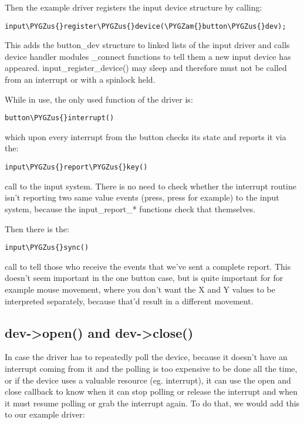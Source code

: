 \documentclass[a4paper,8pt,english]{sphinxmanual}
\def\PYGZus{\char`\_}
\def\PYGZam{\char`\&}
\begin{document}
Then the example driver registers the input device structure by calling:

\begin{Verbatim}[commandchars=\\\{\}]
input\PYGZus{}register\PYGZus{}device(\PYGZam{}button\PYGZus{}dev);
\end{Verbatim}

This adds the button\_dev structure to linked lists of the input driver and
calls device handler modules \_connect functions to tell them a new input
device has appeared. input\_register\_device() may sleep and therefore must
not be called from an interrupt or with a spinlock held.

While in use, the only used function of the driver is:

\begin{Verbatim}[commandchars=\\\{\}]
button\PYGZus{}interrupt()
\end{Verbatim}

which upon every interrupt from the button checks its state and reports it
via the:

\begin{Verbatim}[commandchars=\\\{\}]
input\PYGZus{}report\PYGZus{}key()
\end{Verbatim}

call to the input system. There is no need to check whether the interrupt
routine isn't reporting two same value events (press, press for example) to
the input system, because the input\_report\_* functions check that
themselves.

Then there is the:

\begin{Verbatim}[commandchars=\\\{\}]
input\PYGZus{}sync()
\end{Verbatim}

call to tell those who receive the events that we've sent a complete report.
This doesn't seem important in the one button case, but is quite important
for for example mouse movement, where you don't want the X and Y values
to be interpreted separately, because that'd result in a different movement.


\subsection{dev-\textgreater{}open() and dev-\textgreater{}close()}
\label{input/input-programming:dev-open-and-dev-close}
In case the driver has to repeatedly poll the device, because it doesn't
have an interrupt coming from it and the polling is too expensive to be done
all the time, or if the device uses a valuable resource (eg. interrupt), it
can use the open and close callback to know when it can stop polling or
release the interrupt and when it must resume polling or grab the interrupt
again. To do that, we would add this to our example driver:
\end{document}
